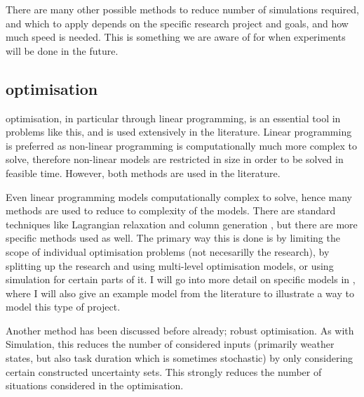 \documentclass[a4paper,12pt]{article}
\begin{document}
There are many other possible methods to reduce number of simulations required, and which to apply depends on the specific research project and goals, and how much speed is needed. This is something we are aware of for when experiments will be done in the future. 

\bigskip

\subsection{optimisation} \label{ss:opt}
optimisation, in particular through linear programming, is an essential tool in problems like this, and is used extensively in the literature. Linear programming is preferred as non-linear programming is computationally much more complex to solve, therefore non-linear models are restricted in size in order to be solved in feasible time. However, both methods are used in the literature.

Even linear programming models computationally complex to solve, hence many methods are used to reduce to complexity of the models. There are standard techniques like Lagrangian relaxation \cite{fisher1981lagrangian} and column generation \cite{barnhart1998branch}, but there are more specific methods used as well. The primary way this is done is by limiting the scope of individual optimisation problems (not necesarilly the research), by splitting up the research and using multi-level optimisation models, or using simulation for certain parts of it. I will go into more detail on specific models in , where I will also give an example model from the literature to illustrate a way to model this type of project.


Another method has been discussed before already; robust optimisation. As with Simulation, this reduces the number of considered inputs (primarily weather states, but also task duration which is sometimes stochastic) by only considering certain constructed uncertainty sets. This strongly reduces the number of situations considered in the optimisation. 

\bigskip
\end{document}
